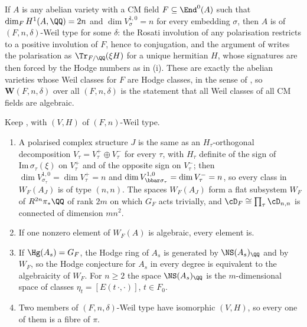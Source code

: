 \begin{remark}\label{rem:cmmember}
If $A$ is any abelian variety with a CM field $F\subseteq\End^{0}(A)$ such
that $\dim_{F}H^{1}(A,\QQ)=2n$ and $\dim V_{\sigma}^{1,0}=n$ for every
embedding $\sigma$, then $A$ is of $(F,n,\delta)$-Weil type for some
$\delta$: the Rosati involution of any polarisation restricts to a positive
involution of $F$, hence to conjugation, and the argument of
 writes the polarisation as $\Tr_{F/\QQ}(\xi H)$ for a
unique hermitian $H$, whose signatures are then forced by the Hodge numbers
as in (i). These are exactly the abelian varieties whose
Weil classes for $F$ are Hodge classes, in the sense of \cite{MZ99}, so
$\mathbf{W}(F,n,\delta)$ over all $(F,n,\delta)$ is the statement that all
Weil classes of all CM fields are algebraic.
\end{remark}

\begin{proposition}\label{prop:cmweil}
Keep , with $(V,H)$ of $(F,n)$-Weil type.
\begin{enumerate}[label=\textup{(\roman*)},leftmargin=2.6em,itemsep=2pt]
\item A polarised complex structure $J$ is the same as an $H_{\tau}$-orthogonal
  decomposition $V_{\tau}=V_{\tau}^{+}\oplus V_{\tau}^{-}$ for every $\tau$,
  with $H_{\tau}$ definite of the sign of $\mathrm{Im}\,\sigma_{\tau}(\xi)$ on
  $V_{\tau}^{+}$ and of the opposite sign on $V_{\tau}^{-}$; then
  $\dim V^{1,0}_{\sigma_{\tau}}=\dim V_{\tau}^{+}=n$ and
  $\dim V^{1,0}_{\bbar\sigma_{\tau}}=\dim V_{\tau}^{-}=n$, so every class in
  $W_{F}(A_{J})$ is of type $(n,n)$. The spaces $W_{F}(A_{J})$ form a flat
  subsystem $W_{F}$ of $R^{2n}\pi_{*}\QQ$ of rank $2m$ on which $G_{F}$ acts
  trivially, and $\cD_{F}\cong\prod_{\tau}\cD_{n,n}$ is connected of
  dimension $mn^{2}$.
\item If one nonzero element of $W_{F}(A)$ is algebraic, every element is.
\item If $\Hg(A_{s})=G_{F}$, the Hodge ring of $A_{s}$ is generated by
  $\NS(A_{s})_{\QQ}$ and by $W_{F}$, so the Hodge conjecture for $A_{s}$ in
  every degree is equivalent to the algebraicity of $W_{F}$. For $n\ge2$ the
  space $\NS(A_{s})_{\QQ}$ is the $m$-dimensional space of classes
  $\eta_{t}=[E(t\,\cdot,\cdot)]$, $t\in F_{0}$.
\item Two members of $(F,n,\delta)$-Weil type have isomorphic $(V,H)$, so
  every one of them is a fibre of $\pi$.
\end{enumerate}
\end{proposition}

